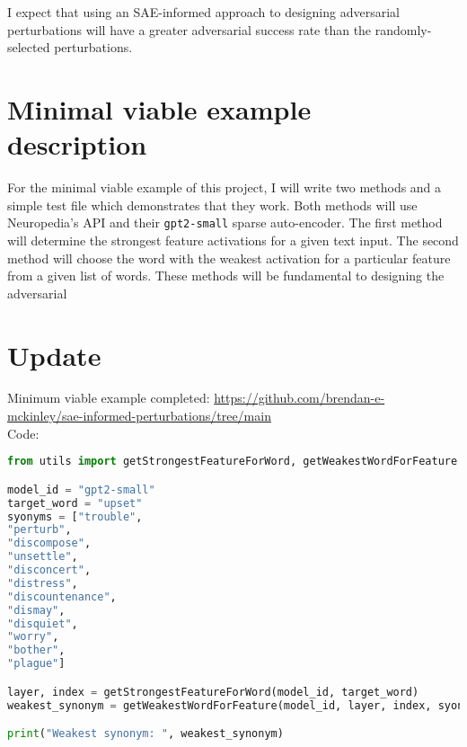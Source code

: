 \documentclass{article}
\begin{document}
I expect that using an SAE-informed approach to designing adversarial perturbations will have a greater adversarial success rate than the randomly-selected perturbations.

\section*{Minimal viable example description}

For the minimal viable example of this project, I will write two methods and a simple test file which demonstrates that they work. Both methods will use Neuropedia's API and their \texttt{gpt2-small} sparse auto-encoder. The first method will determine the strongest feature activations for a given text input. The second method will choose the word with the weakest activation for a particular feature from a given list of words. These methods will be fundamental to designing the adversarial 

\section*{Update}

Minimum viable example completed: \url{https://github.com/brendan-e-mckinley/sae-informed-perturbations/tree/main}\\

Code: 

\begin{lstlisting}[language=Python, caption={Test}, label=code:weakest-synonym, basicstyle=\ttfamily\small, keywordstyle=\color{blue}, commentstyle=\color{gray}]
from utils import getStrongestFeatureForWord, getWeakestWordForFeature

model_id = "gpt2-small"
target_word = "upset"
syonyms = ["trouble",
"perturb",
"discompose",
"unsettle",
"disconcert",
"distress",
"discountenance",
"dismay",
"disquiet",
"worry",
"bother",
"plague"]

layer, index = getStrongestFeatureForWord(model_id, target_word)
weakest_synonym = getWeakestWordForFeature(model_id, layer, index, syonyms)

print("Weakest synonym: ", weakest_synonym)
\end{lstlisting}
\end{document}
